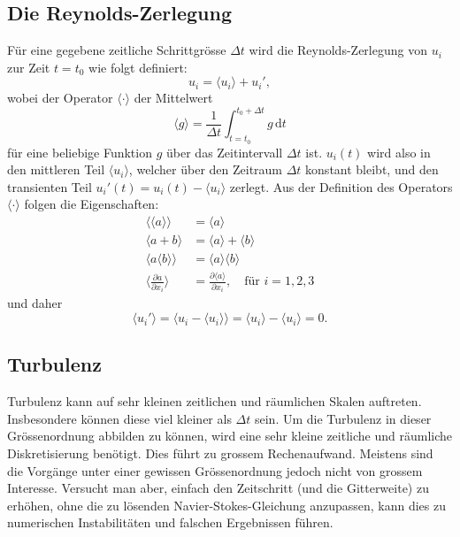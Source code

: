 \subsection{Die Reynolds-Zerlegung}
%
Für eine gegebene zeitliche Schrittgrösse $\Delta t$ wird die Reynolds-Zerlegung von $u_i$ zur Zeit $t = t_0$
wie folgt definiert:
%
\newcommand{\ravg}[1]{\ensuremath{\langle #1 \rangle}}
\newcommand{\rdecomp}[1]{\ensuremath{\ravg{#1} + #1'}}
%
\begin{equation}
    \label{reynolds:eqs:reynolds-decomp}
    u_i = \rdecomp{u_i},
\end{equation}
%
wobei der Operator $\ravg{\cdot}$ der Mittelwert
%
\begin{equation}
    \ravg{g} = \frac{1}{\Delta t}\int_{t=t_0}^{t_0 + \Delta t} g \mathrm{\,d}t
\end{equation}
%
für eine beliebige Funktion $g$ über das Zeitintervall $\Delta t$ ist.
%
$u_i(t)$ wird also in den mittleren Teil $\ravg{u_i}$, welcher über den Zeitraum
$\Delta t$ konstant bleibt, und den transienten Teil $u_i'(t) = u_i(t) - \langle u_i \rangle$
zerlegt.
%
Aus der Definition des Operators $\ravg{\cdot}$ folgen die Eigenschaften:
%
\begin{align}
    \ravg{\ravg{a}} &= \ravg{a} \\
    \ravg{a + b} &= \ravg{a} + \ravg{b} \\
    \ravg{a \ravg{b}} &= \ravg{a} \ravg{b} \\
    \label{reynolds:eqs:ravg-partial}
    \biggl\langle\frac{\partial a}{\partial x_i}\biggr\rangle &=
        \frac{\partial \ravg{a}}{\partial x_i},\quad\text{für $i = 1, 2, 3$}
\end{align}
%
und daher
%
\begin{equation}
    \label{reynolds:eqs:trans-cancel}
    \ravg{u_i'} = \ravg{u_i - \ravg{u_i}} = \ravg{u_i} - \ravg{u_i} = 0.
\end{equation}
%
\subsection{Turbulenz}
%
Turbulenz kann auf sehr kleinen zeitlichen und räumlichen Skalen auftreten.
Insbesondere können diese viel kleiner als $\Delta t$ sein. Um die Turbulenz in dieser
Grössenordnung abbilden zu können, wird eine sehr kleine zeitliche und räumliche Diskretisierung
benötigt. Dies führt zu grossem Rechenaufwand. Meistens sind die Vorgänge unter
einer gewissen Grössenordnung jedoch nicht von grossem Interesse. Versucht man aber, einfach den Zeitschritt
(und die Gitterweite) zu erhöhen, ohne die zu lösenden Navier-Stokes-Gleichung
anzupassen, kann dies zu numerischen Instabilitäten und falschen Ergebnissen führen.
%
